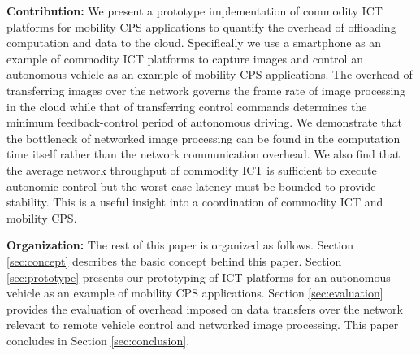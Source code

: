 \textbf{Contribution:}
We present a prototype implementation of commodity ICT platforms for
mobility CPS applications to quantify the overhead of offloading
computation and data to the cloud.
Specifically we use a smartphone as an example of commodity ICT
platforms to capture images and control an autonomous vehicle as an
example of mobility CPS applications.
The overhead of transferring images over the network governs the frame
rate of image processing in the cloud while that of transferring control
commands determines the minimum feedback-control period of autonomous
driving.
We demonstrate that the bottleneck of networked image processing can be
found in the computation time itself rather than the network
communication overhead.
We also find that the average network throughput of commodity ICT is
sufficient to execute autonomic control but the worst-case latency must
be bounded to provide stability.
This is a useful insight into a coordination of commodity ICT and
mobility CPS.

\textbf{Organization:}
The rest of this paper is organized as follows.
Section \ref{sec:concept} describes the basic concept behind this
paper.
Section \ref{sec:prototype} presents our prototyping of ICT platforms
for an autonomous vehicle as an example of mobility CPS applications.
Section \ref{sec:evaluation} provides the evaluation of overhead imposed
on data transfers over the network relevant to remote vehicle control
and networked image processing.
This paper concludes in Section \ref{sec:conclusion}.